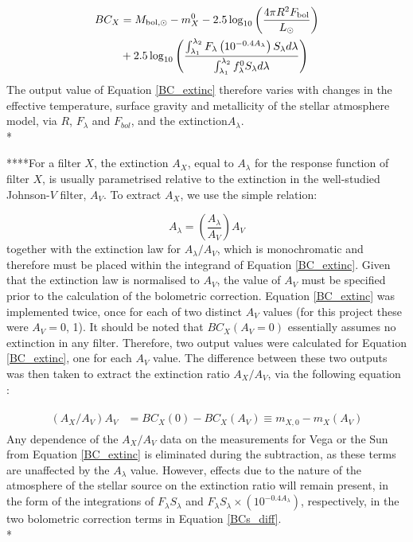 \documentclass[12pt, a4paper]{report}
\begin{document}
\begin{align}
\begin{split}
BC_{X} &= M_{\textnormal{bol},\odot} - m_{X}^{0} - 2.5 \log_{10} \left( \frac{4\pi R^{2}F_{\textnormal{bol}}}{L_{\odot}} \right) \\
&+ 2.5 \log_{10} \left( \frac{\int_{\lambda_{1}}^{\lambda_{2}} F_{\lambda} \left( 10^{-0.4 A_{\lambda}} \right) S_{\lambda} d\lambda}{\int_{\lambda_{1}}^{\lambda_{2}} f_{\lambda}^{0} S_{\lambda} d\lambda} \right)
\label{BC_extinc}
\end{split}
\end{align}
The output value of Equation \ref{BC_extinc} therefore varies with changes in the effective temperature, surface gravity and metallicity of the stellar atmosphere model, via $R$, $F_{\lambda}$ and $F_{bol}$, and the extinction$ A_{\lambda}$.\\*

****For a filter $X$, the extinction $A_{X}$, equal to $A_{\lambda}$ for the response function of filter $X$, is usually parametrised relative to the extinction in the well-studied Johnson-$V$ filter, $A_{V}$. To extract $A_{X}$, we use the simple relation:

\begin{equation}
A_{\lambda} = \left( \frac{A_{\lambda}}{A_{V}} \right) A_{V}
\label{ratio_eq}
\end{equation}
together with the \cite{1989ApJ...345..245C} extinction law for $A_{\lambda}/A_{V}$, which is monochromatic and therefore must be placed within the integrand of Equation \ref{BC_extinc}. Given that the \cite{1989ApJ...345..245C} extinction law is normalised to $A_{V}$, the value of $A_{V}$ must be specified prior to the calculation of the bolometric correction. Equation \ref{BC_extinc} was implemented twice, once for each of two distinct $A_{V}$ values (for this project these were $A_{V} = 0$, 1). It should be noted that $BC_{X}(A_{V}=0)$ essentially assumes no extinction in any filter. Therefore, two output values were calculated for Equation \ref{BC_extinc}, one for each $A_{V}$ value. The difference between these two outputs was then taken to extract the extinction ratio $A_{X}/A_{V}$, via the following equation \citep{2008PASP..120..583G}:

\begin{align}
\begin{split}
\left(A_{X}/A_{V}\right)A_{V} &= BC_{X}(0) - BC_{X}(A_{V}) \equiv m_{X,0} - m_{X}(A_{V})
\label{BCs_diff}
\end{split}
\end{align}
Any dependence of the $A_{X}/A_{V}$ data on the measurements for Vega or the Sun from Equation \ref{BC_extinc} is eliminated during the subtraction, as these terms are unaffected by the $A_{\lambda}$ value. However, effects due to the nature of the atmosphere of the stellar source on the extinction ratio will remain present, in the form of the integrations of $F_{\lambda}S_{\lambda}$ and $F_{\lambda}S_{\lambda} \times \left( 10^{-0.4 A_{\lambda}} \right)$, respectively, in the two bolometric correction terms in Equation \ref{BCs_diff}. \\*
\end{document}
